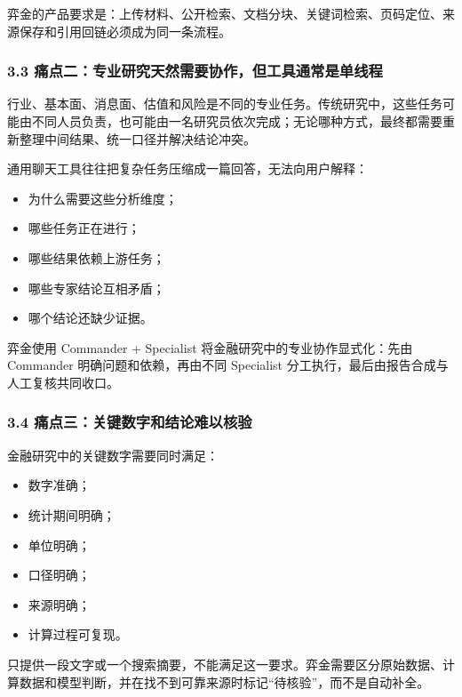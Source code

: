 \documentclass[a4paper,12pt,fontset=none]{ctexart}
\begin{document}
弈金的产品要求是：上传材料、公开检索、文档分块、关键词检索、页码定位、来源保存和引用回链必须成为同一条流程。

\subsubsection{3.3
痛点二：专业研究天然需要协作，但工具通常是单线程}\label{ux75dbux70b9ux4e8cux4e13ux4e1aux7814ux7a76ux5929ux7136ux9700ux8981ux534fux4f5cux4f46ux5de5ux5177ux901aux5e38ux662fux5355ux7ebfux7a0b}

行业、基本面、消息面、估值和风险是不同的专业任务。传统研究中，这些任务可能由不同人员负责，也可能由一名研究员依次完成；无论哪种方式，最终都需要重新整理中间结果、统一口径并解决结论冲突。

通用聊天工具往往把复杂任务压缩成一篇回答，无法向用户解释：

\begin{itemize}
\tightlist
\item
  为什么需要这些分析维度；
\item
  哪些任务正在进行；
\item
  哪些结果依赖上游任务；
\item
  哪些专家结论互相矛盾；
\item
  哪个结论还缺少证据。
\end{itemize}

弈金使用 Commander + Specialist 将金融研究中的专业协作显式化：先由
Commander 明确问题和依赖，再由不同 Specialist
分工执行，最后由报告合成与人工复核共同收口。

\subsubsection{3.4
痛点三：关键数字和结论难以核验}\label{ux75dbux70b9ux4e09ux5173ux952eux6570ux5b57ux548cux7ed3ux8bbaux96beux4ee5ux6838ux9a8c}

金融研究中的关键数字需要同时满足：

\begin{itemize}
\tightlist
\item
  数字准确；
\item
  统计期间明确；
\item
  单位明确；
\item
  口径明确；
\item
  来源明确；
\item
  计算过程可复现。
\end{itemize}

只提供一段文字或一个搜索摘要，不能满足这一要求。弈金需要区分原始数据、计算数据和模型判断，并在找不到可靠来源时标记``待核验''，而不是自动补全。
\end{document}
